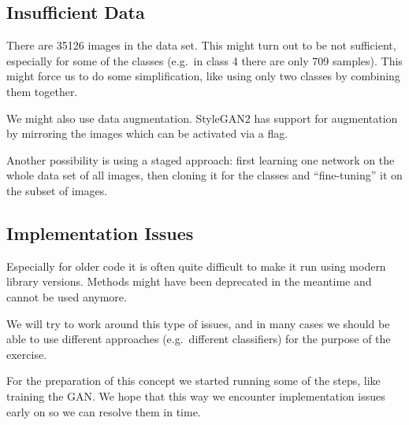 \documentclass[sigconf,nonacm]{acmart}
\begin{document}
\subsection{Insufficient Data}

There are \SI{35126}{} images in the data set.
This might turn out to be not
sufficient, especially for some of the classes (e.g.\ in class 4
there are only 709 samples).
This might force us to do some simplification, like using only two
classes by combining them together.

We might also use data augmentation. StyleGAN2 has support for
augmentation by mirroring the images which can be activated
via a flag.

Another possibility is using a staged approach: first learning
one network on the whole data set of all images, then
cloning it for the classes and ``fine-tuning'' it on the subset
of images.

\subsection{Implementation Issues}

Especially for older code it is often quite difficult to
make it run using modern library versions.
Methods might have been deprecated in the meantime and cannot
be used anymore.

We will try to work around this type of issues, and in many cases
we should be able to use different approaches (e.g.\ different
classifiers) for the purpose of the exercise.

For the preparation of this concept we started running some
of the steps, like training the GAN.
We hope that this way we encounter implementation issues early on
so we can resolve them in time.



\end{document}
